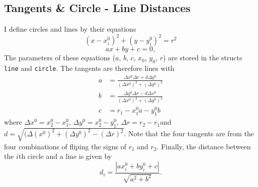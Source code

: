 \documentclass[11pt]{article}
\begin{document}
\subsection{Tangents \& Circle - Line Distances}
\label{sec:tangents}
I define circles and lines by their equations
\begin{equation}
    (x - x^0_i)^2 + (y - y^0_i)^2 = r^2
    \label{eq:circle}
\end{equation}
\begin{equation}
    ax + by + c = 0,
    \label{eq:line}
\end{equation}
The parameters of these equations ($a$, $b$, $c$, $x_0$, $y_0$, $r$) are stored in the structs \texttt{line} and \texttt{circle}. The tangents are therefore \cite{circle-tangents} lines with
\begin{equation}\label{eq:tange/nts}
\begin{split}
    a &= \frac{\Delta x^0  \Delta r + d\Delta y^0}{(\Delta x^0)^2 + (\Delta y^0)^2}\\%
    b &= \frac{\Delta y^0 \Delta r - d\Delta x^0}{(\Delta x^0)^2 + (\Delta y^0)^2}\\
    c &= r_1 - x^0_1a - y^0_1b
\end{split}
\end{equation}
where $\Delta x^0 = x^0_2 - x^0_1$, $\Delta y^0 = x^0_2 - y^0_1$, $\Delta r=r_2 - r_1$and $d=\sqrt{(\Delta (x^0)^2 + (\Delta y^0)^2-(\Delta r)^2}$. Note that the four tangents are from the four combinations of fliping the signs of $r_1$ and $r_2$. Finally, the distance between the $i$th circle and a line is given by
\begin{equation}
    d_i = \frac{|{ax^0_i + by^0_i + c}|}{\sqrt{a^2 + b^2}}.
    \label{eq:dist}
\end{equation}
\end{document}
